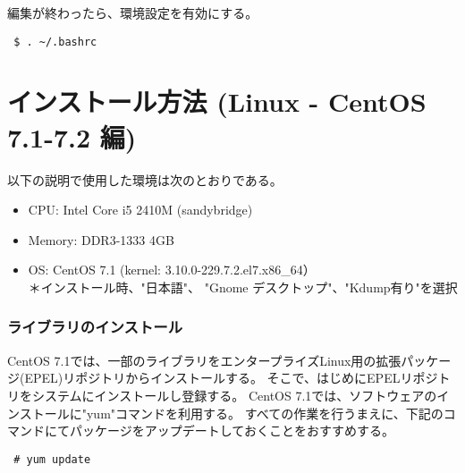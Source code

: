 編集が終わったら、環境設定を有効にする。
\begin{verbatim}
 $ . ~/.bashrc
\end{verbatim}


%
%


\section{インストール方法 (Linux - CentOS 7.1-7.2 編)} \label{chap:install_centos71}

以下の説明で使用した環境は次のとおりである。
\begin{itemize}
\item CPU: Intel Core i5 2410M (sandybridge)
\item Memory: DDR3-1333 4GB
\item OS: CentOS 7.1 (kernel: 3.10.0-229.7.2.el7.x86\_64）\\
{\small ＊インストール時、"日本語"、 "Gnome デスクトップ"、"Kdump有り"を選択}
\end{itemize}

\subsubsection{ライブラリのインストール}

CentOS 7.1では、一部のライブラリをエンタープライズLinux用の拡張パッケージ(EPEL)リポジトリからインストールする。
そこで、はじめにEPELリポジトリをシステムにインストールし登録する。
CentOS 7.1では、ソフトウェアのインストールに"yum"コマンドを利用する。
すべての作業を行うまえに、下記のコマンドにてパッケージをアップデートしておくことをおすすめする。
\begin{verbatim}
 # yum update
\end{verbatim}

